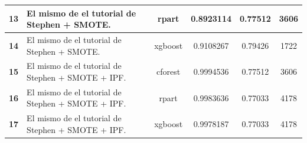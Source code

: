 \documentclass[10pt,a4paper]{article}
\begin{document}
\begin{landscape}
\begin{table}[H]
\begin{tabular}{|c|l|c|c|c|c|}
\multicolumn{1}{|l|}{\textbf{13}} & El mismo de el tutorial de Stephen + SMOTE.                                                                                                                                                                                                                                 & rpart                                  & 0.8923114                                                        & 0.77512                                                         & 3606             \\ \hline
\multicolumn{1}{|l|}{\textbf{14}} & El mismo de el tutorial de Stephen + SMOTE.                                                                                                                                                                                                                                 & xgboost                                & 0.9108267                                                        & 0.79426                                                         & 1722             \\ \hline
\multicolumn{1}{|l|}{\textbf{15}} & El mismo de el tutorial de Stephen + SMOTE + IPF.                                                                                                                                                                                                                           & cforest                                & 0.9994536                                                        & 0.77512                                                         & 3606             \\ \hline
\multicolumn{1}{|l|}{\textbf{16}} & El mismo de el tutorial de Stephen + SMOTE + IPF.                                                                                                                                                                                                                           & rpart                                  & 0.9983636                                                        & 0.77033                                                         & 4178             \\ \hline
\multicolumn{1}{|l|}{\textbf{17}} & El mismo de el tutorial de Stephen + SMOTE + IPF.                                                                                                                                                                                                                           & xgboost                                & 0.9978187                                                        & 0.77033                                                         & 4178             \\ \hline
\end{tabular}
\end{table}

\end{landscape}
\end{document}
